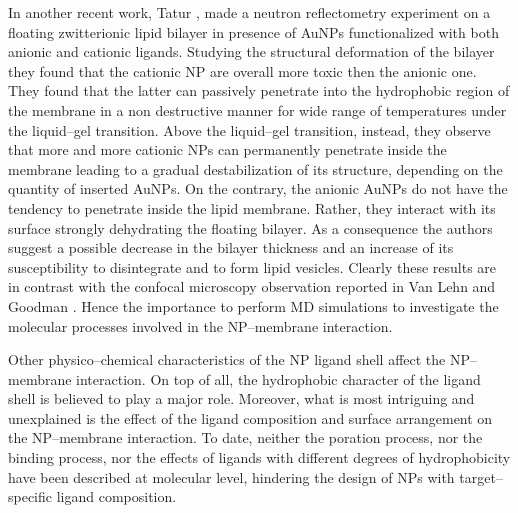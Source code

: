 In another recent work, Tatur \etal{} \cite{Maccarini2013}, made a neutron reflectometry experiment on a floating zwitterionic lipid bilayer in presence of \acp{AuNP} functionalized with both anionic and cationic ligands. Studying the structural deformation of the bilayer they found that the cationic \acs{NP} are overall more toxic then the anionic one. They found that the latter can passively penetrate into the hydrophobic region of the membrane in a non destructive manner for wide range of temperatures under the liquid--gel transition. Above the liquid--gel transition, instead, they observe that more and more cationic \acp{NP} can permanently penetrate inside the membrane leading to a gradual destabilization of its structure, depending on the quantity of inserted \acp{AuNP}. On the contrary, the anionic \acp{AuNP} do not have the tendency to penetrate inside the lipid membrane. Rather, they interact with its surface strongly dehydrating the floating bilayer. As a consequence the authors suggest a possible decrease in the bilayer thickness and an increase of its susceptibility to disintegrate and to form lipid vesicles. Clearly these results are in contrast with the confocal microscopy observation reported in Van Lehn \etal{} \cite{VanLehn2013} and Goodman \etal{} \cite{Goodman2004}. Hence the importance to perform \ac{MD} simulations to investigate the molecular processes involved in the \ac{NP}--membrane interaction.

Other physico--chemical characteristics of the \ac{NP} ligand shell affect the \ac{NP}--membrane interaction. On top of all, the hydrophobic character of the ligand shell is believed to play a major role. Moreover, what is most intriguing and unexplained is the effect of the ligand composition and surface arrangement on the \ac{NP}--membrane interaction. To date, neither the poration process, nor the binding process, nor the effects of ligands with different degrees of hydrophobicity have been described at molecular level, hindering the design of \acp{NP} with target--specific ligand composition.

